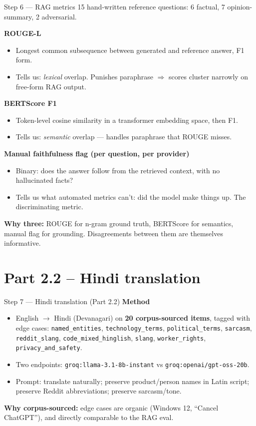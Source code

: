 \documentclass[10pt,aspectratio=169]{beamer}
\begin{document}
\begin{frame}{Step 6 — RAG metrics}
15 hand-written reference questions: 6 factual, 7 opinion-summary, 2 adversarial.

\medskip
\textbf{ROUGE-L}
\begin{itemize}
  \item Longest common subsequence between generated and reference answer, F1 form.
  \item Tells us: \emph{lexical} overlap. Punishes paraphrase $\Rightarrow$ scores cluster narrowly on free-form RAG output.
\end{itemize}

\textbf{BERTScore F1}
\begin{itemize}
  \item Token-level cosine similarity in a transformer embedding space, then F1.
  \item Tells us: \emph{semantic} overlap — handles paraphrase that ROUGE misses.
\end{itemize}

\textbf{Manual faithfulness flag (per question, per provider)}
\begin{itemize}
  \item Binary: does the answer follow from the retrieved context, with no hallucinated facts?
  \item Tells us what automated metrics can't: did the model make things up. The discriminating metric.
\end{itemize}

\medskip
\textbf{Why three:} ROUGE for n-gram ground truth, BERTScore for semantics, manual flag for grounding. Disagreements between them are themselves informative.
\end{frame}

\section{Part 2.2 -- Hindi translation}

\begin{frame}{Step 7 — Hindi translation (Part 2.2)}
\textbf{Method}
\begin{itemize}
  \item English $\to$ Hindi (Devanagari) on \textbf{20 corpus-sourced items}, tagged with edge cases: \texttt{named\_entities}, \texttt{technology\_terms}, \texttt{political\_terms}, \texttt{sarcasm}, \texttt{reddit\_slang}, \texttt{code\_mixed\_hinglish}, \texttt{slang}, \texttt{worker\_rights}, \texttt{privacy\_and\_safety}.
  \item Two endpoints: \texttt{groq:llama-3.1-8b-instant} vs \texttt{groq:openai/gpt-oss-20b}.
  \item Prompt: translate naturally; preserve product/person names in Latin script; preserve Reddit abbreviations; preserve sarcasm/tone.
\end{itemize}

\medskip
\textbf{Why corpus-sourced:} edge cases are organic (Windows 12, ``Cancel ChatGPT''), and directly comparable to the RAG eval.
\end{frame}
\end{document}
